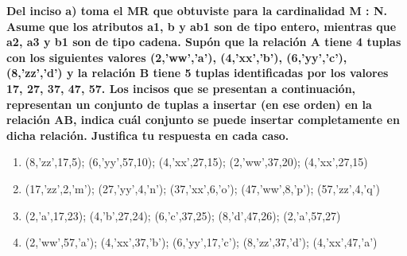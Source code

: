 \textbf{Del inciso a) toma el MR que obtuviste para la cardinalidad M : N. Asume que los atributos a1, b y ab1 son de tipo
entero, mientras que a2, a3 y b1 son de tipo cadena. Supón que la relación A tiene 4 tuplas con los siguientes valores
(2,’ww’,’a’), (4,’xx’,’b’), (6,’yy’,’c’), (8,’zz’,’d’) y la relación B tiene 5 tuplas identificadas por
los valores 17, 27, 37, 47, 57. Los incisos que se presentan a continuación, representan un conjunto de tuplas
a insertar (en ese orden) en la relación AB, indica cuál conjunto se puede insertar completamente en dicha relación.
Justifica tu respuesta en cada caso.}\vspace{.3cm}

\begin{enumerate}
    \item (8,’zz’,17,5); (6,’yy’,57,10); (4,’xx’,27,15); (2,’ww’,37,20); (4,’xx’,27,15)
    \item (17,’zz’,2,’m’); (27,’yy’,4,’n’); (37,’xx’,6,’o’); (47,’ww’,8,’p’); (57,’zz’,4,’q’)
    \item (2,’a’,17,23); (4,’b’,27,24); (6,’c’,37,25); (8,’d’,47,26); (2,’a’,57,27)
    \item (2,’ww’,57,’a’); (4,’xx’,37,’b’); (6,’yy’,17,’c’); (8,’zz’,37,’d’); (4,’xx’,47,’a’)
\end{enumerate}

\vspace{.5cm}
